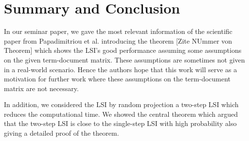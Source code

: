\documentclass[a4paper,11pt,DIV=15]{scrartcl} %
\theoremstyle{plain}
\theoremstyle{definition}
\begin{document}










\section{Summary and Conclusion} %
In our seminar paper, we gave the most relevant information of the scientific paper from Papadimitriou et al. introducing the theorem [Zite NUmmer von Theorem] which shows the LSI's good performance assuming some assumptions on the given term-document matrix. These assumptions are sometimes not given in a real-world scenario. Hence the authors hope that this work will serve as a motivation for further work where these assumptions on the term-document matrix are not necessary.

In addition, we considered the LSI by random projection a two-step LSI which reduces the computational time. We showed the central theorem which argued that the two-step LSI is close to the single-step LSI with high probability also giving a detailed proof of the theorem.










\clearpage



\end{document}
